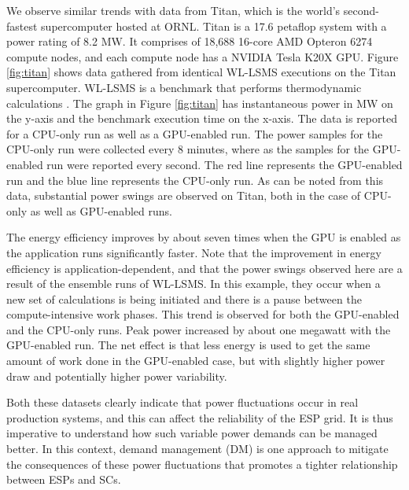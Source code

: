 We observe similar trends with data from Titan, which is the world's second-fastest supercomputer hosted at ORNL. Titan is a 17.6 petaflop system with a power rating of 8.2 MW. It comprises of 18,688 16-core AMD Opteron 6274 compute nodes, and each compute node has a NVIDIA Tesla K20X GPU. Figure \ref{fig:titan} shows data gathered from identical WL-LSMS executions on the Titan supercomputer. WL-LSMS is a benchmark that performs thermodynamic calculations  \cite{WLLSMS}. The graph in Figure \ref{fig:titan} has instantaneous power in MW on the y-axis and the benchmark execution time on the x-axis. The data is reported for a CPU-only run as well as a GPU-enabled run. The power samples for the CPU-only run were collected every 8 minutes, where as the samples for the GPU-enabled run were reported every second. The red line represents the GPU-enabled run and the blue line represents the CPU-only run.  As can be noted from this data, substantial power swings are observed on Titan, both in the case of CPU-only as well as GPU-enabled runs. 

The energy efficiency improves by about seven times when the GPU is enabled as the application runs significantly faster. Note that the improvement in energy efficiency is application-dependent, and that the power swings observed here are a result of the ensemble runs of WL-LSMS. In this example, they occur when a new set of calculations is being initiated and there is a pause between the compute-intensive work phases. This trend is observed for both the GPU-enabled and the CPU-only runs. Peak power increased by about one megawatt with the GPU-enabled run. The net effect is that less energy is used to get the same amount of work done in the GPU-enabled case, but with slightly higher power draw and potentially higher power variability.

Both these datasets clearly indicate that power fluctuations occur in real production systems, and this can affect the reliability of the ESP grid. It is thus imperative to understand how such variable power demands can be managed better. In this context, demand management (DM) is one approach to mitigate the consequences of these power fluctuations that promotes a tighter relationship between ESPs and SCs. %

